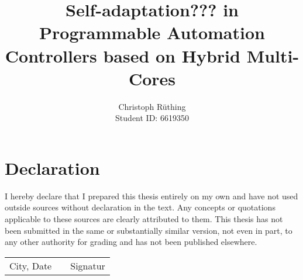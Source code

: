 \documentclass[
	a4paper,
	12pt,
	twoside,
	DIV=12,
	BCOR=15mm,
	abstracton,
	parskip,
	listof=totoc,
	bibliography=totoc]{scrreprt}
\begin{document}

\subject{
	Master Thesis }
\title{
	Self-adaptation??? in Programmable Automation Controllers based on Hybrid
	Multi-Cores}
\author{
	Christoph Rüthing\\[-12pt]
	Student ID: 6619350}
\publishers{
	{\large Supervisors}\\[12pt]
	Prof. Dr. Marco Platzner\\
	Dipl.-Inf. Andreas Agne}
\lowertitleback{
	Master Thesis\\
	\textbf{
		Self-adaptation in Programmable Automation Controller\\
		based on Hybrid Multi-Cores}\\[.5cm]
	University of Paderborn\\
	Faculty of Electrical Engineering, Computer Science and Mathematics\\
	Department of Computer Science\\
	Warburger Str. 100\\
	33098 Paderborn}

\maketitle

\cleardoublepage



\chapter*{Declaration}

I hereby declare that I prepared this thesis entirely on my own and have not
used outside sources without declaration in the text. Any concepts or
quotations applicable to these sources are clearly attributed to them. This
thesis has not been submitted in the same or substantially similar version,
not even in part, to any other authority for grading and has not been
published elsewhere.\\[27pt]

\begin{center}
	\begin{tabular}{l p{} r}
		\cline{1-1}\cline{3-3}
		\begin{minipage}[t]{0.4\textwidth}
			\centering
			City, Date
		\end{minipage}
		&
		\begin{minipage}[t]{0.2\textwidth}
		\end{minipage}
		&
		\begin{minipage}[t]{0.4\textwidth}
  			\centering
  			Signatur
		\end{minipage}
	\end{tabular}
\end{center}
\end{document}
